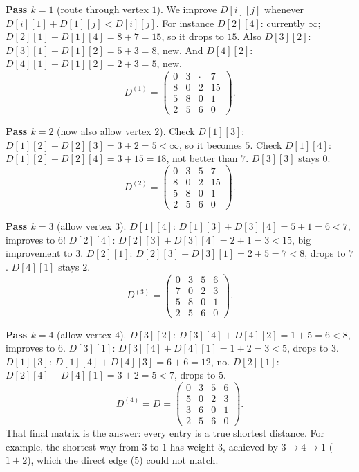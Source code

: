 \begin{labbox}
\textbf{Pass $k=1$} (route through vertex $1$). We improve $D[i][j]$ whenever
$D[i][1] + D[1][j] < D[i][j]$. For instance $D[2][4]$: currently $\infty$;
$D[2][1] + D[1][4] = 8 + 7 = 15$, so it drops to $15$. Also $D[3][2]$:
$D[3][1] + D[1][2] = 5 + 3 = 8$, new. And $D[4][2]$: $D[4][1] + D[1][2] = 2 + 3
= 5$, new.
\[
D^{(1)}=
\begin{pmatrix}
0 & 3 & \cdot & 7\\
8 & 0 & 2 & 15\\
5 & 8 & 0 & 1\\
2 & 5 & 6 & 0
\end{pmatrix}.
\]

\textbf{Pass $k=2$} (now also allow vertex $2$). Check $D[1][3]$:
$D[1][2] + D[2][3] = 3 + 2 = 5 < \infty$, so it becomes $5$. Check $D[1][4]$:
$D[1][2] + D[2][4] = 3 + 15 = 18$, not better than $7$. $D[3][3]$ stays $0$.
\[
D^{(2)}=
\begin{pmatrix}
0 & 3 & 5 & 7\\
8 & 0 & 2 & 15\\
5 & 8 & 0 & 1\\
2 & 5 & 6 & 0
\end{pmatrix}.
\]

\textbf{Pass $k=3$} (allow vertex $3$). $D[1][4]$: $D[1][3] + D[3][4] = 5 + 1 =
6 < 7$, improves to $6$! $D[2][4]$: $D[2][3] + D[3][4] = 2 + 1 = 3 < 15$, big
improvement to $3$. $D[2][1]$: $D[2][3] + D[3][1] = 2 + 5 = 7 < 8$, drops to
$7$. $D[4][1]$ stays $2$.
\[
D^{(3)}=
\begin{pmatrix}
0 & 3 & 5 & 6\\
7 & 0 & 2 & 3\\
5 & 8 & 0 & 1\\
2 & 5 & 6 & 0
\end{pmatrix}.
\]

\textbf{Pass $k=4$} (allow vertex $4$). $D[3][2]$: $D[3][4] + D[4][2] = 1 + 5 =
6 < 8$, improves to $6$. $D[3][1]$: $D[3][4] + D[4][1] = 1 + 2 = 3 < 5$, drops
to $3$. $D[1][3]$: $D[1][4] + D[4][3] = 6 + 6 = 12$, no. $D[2][1]$:
$D[2][4]+D[4][1] = 3 + 2 = 5 < 7$, drops to $5$.
\[
D^{(4)} = D =
\begin{pmatrix}
0 & 3 & 5 & 6\\
5 & 0 & 2 & 3\\
3 & 6 & 0 & 1\\
2 & 5 & 6 & 0
\end{pmatrix}.
\]
That final matrix is the answer: every entry is a true shortest distance. For
example, the shortest way from $3$ to $1$ has weight $3$, achieved by
$3 \to 4 \to 1$ ($1 + 2$), which the direct edge ($5$) could not match.
\end{labbox}

